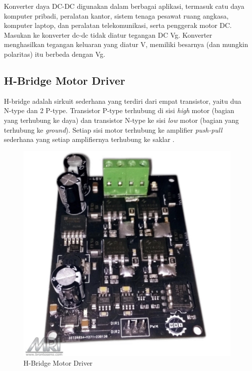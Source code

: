 Konverter daya DC-DC digunakan dalam berbagai aplikasi, termasuk catu daya komputer pribadi, peralatan kantor, sistem tenaga pesawat ruang angkasa, komputer laptop, dan peralatan telekomunikasi, serta penggerak motor DC. Masukan ke konverter dc-dc tidak diatur
tegangan DC Vg. Konverter menghasilkan tegangan keluaran yang diatur V, memiliki besarnya (dan mungkin polaritas) itu berbeda dengan Vg\parencite{dcdc}.

\subsection{H-Bridge Motor Driver}
H-bridge adalah sirkuit sederhana yang terdiri dari empat transistor, yaitu dua N-type dan 2 P-type. Transistor P-type terhubung di sisi \emph{high} motor (bagian yang terhubung ke daya) dan transistor N-type ke sisi \emph{low} motor (bagian yang terhubung ke \emph{ground}). Setiap sisi motor terhubung ke amplifier \emph{push-pull} sederhana yang setiap amplifiernya terhubung ke saklar \parencite{hbridge}.
\begin{figure} [H] \centering
    \includegraphics[scale=0.2]{gambar/hbridge.jpeg}
    \caption{H-Bridge Motor Driver}
    \label{fig:hbridge}
\end{figure}


